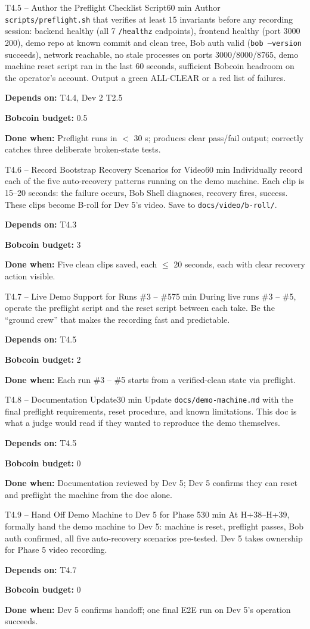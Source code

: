 \documentclass[11pt,letterpaper]{article}
\newcommand{\acceptance}[1]{\par\smallskip\textcolor{ibmgreen}{\textbf{Done when:}} #1}
\newcommand{\depends}[1]{\par\smallskip\textcolor{ibmorange}{\textbf{Depends on:}} #1}
\newcommand{\bobcost}[1]{\par\smallskip\textcolor{ibmaccent}{\textbf{Bobcoin budget:}} #1}
\begin{document}
\begin{task}{T4.5 -- Author the Preflight Checklist Script}{60 min}
Author \texttt{scripts/preflight.sh} that verifies at least 15 invariants before any recording session: backend healthy (all 7 \texttt{/healthz} endpoints), frontend healthy (port 3000 200), demo repo at known commit and clean tree, Bob auth valid (\texttt{bob --version} succeeds), network reachable, no stale processes on ports 3000/8000/8765, demo machine reset script ran in the last 60 seconds, sufficient Bobcoin headroom on the operator's account. Output a green ALL-CLEAR or a red list of failures.
\depends{T4.4, Dev 2 T2.5}
\bobcost{0.5}
\acceptance{Preflight runs in $<$ 30 s; produces clear pass/fail output; correctly catches three deliberate broken-state tests.}
\end{task}

\begin{task}{T4.6 -- Record Bootstrap Recovery Scenarios for Video}{60 min}
Individually record each of the five auto-recovery patterns running on the demo machine. Each clip is 15--20 seconds: the failure occurs, Bob Shell diagnoses, recovery fires, success. These clips become B-roll for Dev 5's video. Save to \texttt{docs/video/b-roll/}.
\depends{T4.3}
\bobcost{3}
\acceptance{Five clean clips saved, each $\leq$ 20 seconds, each with clear recovery action visible.}
\end{task}

\begin{task}{T4.7 -- Live Demo Support for Runs \#3 -- \#5}{75 min}
During live runs \#3 -- \#5, operate the preflight script and the reset script between each take. Be the ``ground crew'' that makes the recording fast and predictable.
\depends{T4.5}
\bobcost{2}
\acceptance{Each run \#3 -- \#5 starts from a verified-clean state via preflight.}
\end{task}

\begin{task}{T4.8 -- Documentation Update}{30 min}
Update \texttt{docs/demo-machine.md} with the final preflight requirements, reset procedure, and known limitations. This doc is what a judge would read if they wanted to reproduce the demo themselves.
\depends{T4.5}
\bobcost{0}
\acceptance{Documentation reviewed by Dev 5; Dev 5 confirms they can reset and preflight the machine from the doc alone.}
\end{task}

\begin{task}{T4.9 -- Hand Off Demo Machine to Dev 5 for Phase 5}{30 min}
At H+38--H+39, formally hand the demo machine to Dev 5: machine is reset, preflight passes, Bob auth confirmed, all five auto-recovery scenarios pre-tested. Dev 5 takes ownership for Phase 5 video recording.
\depends{T4.7}
\bobcost{0}
\acceptance{Dev 5 confirms handoff; one final E2E run on Dev 5's operation succeeds.}
\end{task}
\end{document}
